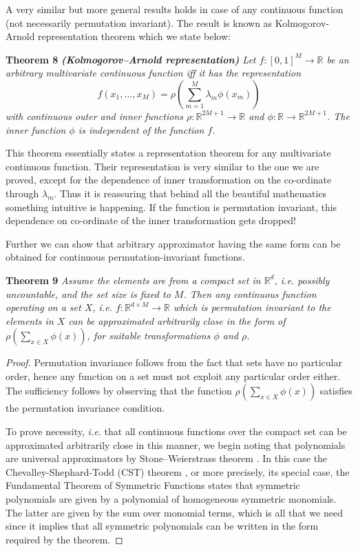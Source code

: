 \documentclass{article}
\newcommand{\latinphrase}[1]{\emph{#1}}    %
\newcommand{\ie}{\latinphrase{i.e.}\xspace}
\begin{document}
A very similar but more general results holds in case of
any continuous function (not necessarily permutation
invariant). The result is known as Kolmogorov-Arnold representation theorem \cite[Chap. 17]{khesin2014arnold} which we state below:

\textbf{Theorem 8} {\em \textbf{(Kolmogorov–Arnold representation)}
\; Let $f: [0, 1]^M \to \mathbb{R}$ be an arbitrary multivariate continuous function iff it has the representation
\begin{equation}
f(x_1, ..., x_M) = \rho\left(\sum_{m=1}^M \lambda_m\phi(x_m)\right)
\end{equation}
with continuous outer and inner functions $\rho:\mathbb{R}^{2M+1}\to\mathbb{R}$ and $\phi:\mathbb{R}\to\mathbb{R}^{2M+1}$. The inner function $\phi$ is independent of the function $f$.
}

This theorem essentially states a representation theorem for any multivariate continuous function. Their representation is very similar to the one we are proved, except for the dependence of inner transformation on the co-ordinate through $\lambda_m$. Thus it is reassuring that behind all the beautiful
mathematics something intuitive is happening. If the function is permutation invariant, this dependence on co-ordinate of the inner transformation gets dropped!

Further we can show that arbitrary approximator having the same form can be obtained for continuous permutation-invariant functions.

\textbf{Theorem 9} {\em 
\; Assume the elements are from a compact set in $\mathbb{R}^d$, \ie possibly uncountable, and the set size is fixed to $M$. Then any continuous function operating on a set $X$, i.e. $f:\mathbb{R}^{d\times M}\to\mathbb{R}$ which is permutation invariant to the elements in $X$ can be approximated arbitrarily close in the form of $\rho \left( \sum_{x\in X} \phi(x) \right)$, for suitable transformations $\phi$ and $\rho$.
}
\begin{proof}
Permutation invariance follows from the fact that sets have no particular order, hence any function on a set must not exploit any particular order either. The sufficiency follows by observing that the function $\rho\left( \sum_{x \in X} \phi(x)\right)$ satisfies the permutation invariance condition. 

To prove necessity, \ie that all continuous functions over the compact set can be approximated arbitrarily close in this manner, we begin noting that polynomials are universal approximators by Stone–Weierstrass theorem \cite[sec. 5.7]{marsden1993elementary}. In this case the Chevalley-Shephard-Todd (CST) theorem \cite[chap. V, theorem 4]{bourbaki1990elements}, or more  precisely, its special case, the Fundamental Theorem of Symmetric Functions states that symmetric polynomials are given by a  polynomial of homogeneous symmetric monomials. The latter are given by the sum over monomial terms, which is all that we need since it implies that all symmetric polynomials can be written in the form required by the theorem.
\end{proof}
\end{document}
